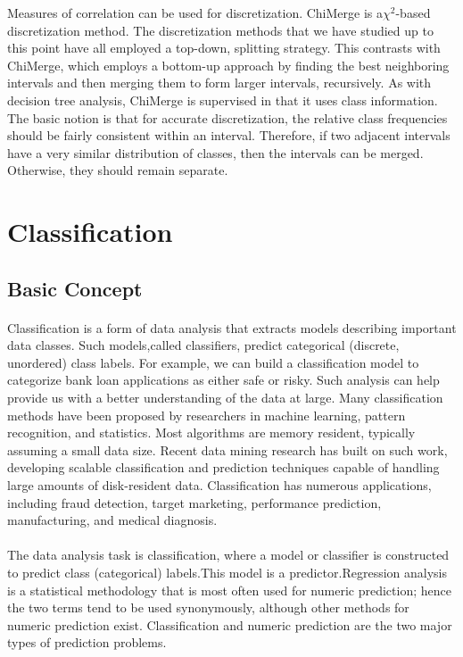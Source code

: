 Measures of correlation can be used for discretization. ChiMerge is a$\chi^{2}$-based discretization method. The
discretization methods that we have studied up to this point have all employed a top-down, splitting strategy.
This contrasts with ChiMerge, which employs a bottom-up approach by finding the best neighboring intervals
and then merging them to form larger intervals, recursively. As with decision tree analysis, ChiMerge is
supervised in that it uses class information. The basic notion is that for accurate discretization, the relative class frequencies should be fairly consistent within an interval. Therefore, if two adjacent intervals have a very
similar distribution of classes, then the intervals can be merged. Otherwise, they should remain separate.
\section{Classification}
\subsection{Basic Concept}

\paragraph{}Classification is a form of data analysis that extracts models describing important data classes. Such models,called classifiers, predict categorical (discrete, unordered) class labels. For example, we can build a
classification model to categorize bank loan applications as either safe or risky. Such analysis can help provide
us with a better understanding of the data at large. Many classification methods have been proposed by
researchers in machine learning, pattern recognition, and statistics. Most algorithms are memory resident,
typically assuming a small data size. Recent data mining research has built on such work, developing scalable
classification and prediction techniques capable of handling large amounts of disk-resident data. Classification
has numerous applications, including fraud detection, target marketing, performance prediction, manufacturing,
and medical diagnosis.

\paragraph{}
The data analysis task is classification, where a model or classifier is constructed to predict class (categorical) labels.This model is a predictor.Regression analysis is a statistical methodology that is most often used for numeric prediction; hence the two terms tend to be used synonymously, although other methods for numeric prediction exist. Classification and numeric prediction are the two major types of prediction problems.


